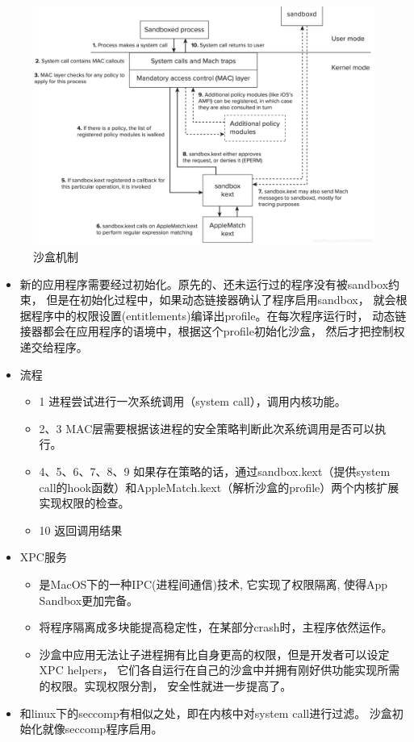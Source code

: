\documentclass[AutoFakeBold,a4paper]{ctexart}
\begin{document}
\begin{figure}[H]
    \centering
    \includegraphics[width=0.92\columnwidth]{Sandbox_Process.png}
    \caption{沙盒机制\cite{blazakis2011apple}}
\end{figure}

\begin{itemize}
    \item 新的应用程序需要经过初始化。原先的、还未运行过的程序没有被sandbox约束，
    但是在初始化过程中，如果动态链接器确认了程序启用sandbox，
    就会根据程序中的权限设置(entitlements)编译出profile。在每次程序运行时，
    动态链接器都会在应用程序的语境中，根据这个profile初始化沙盒，
    然后才把控制权递交给程序。
    \item 流程
    \begin{itemize}
        \item 1 进程尝试进行一次系统调用（system call），调用内核功能。
        \item 2、3 MAC层需要根据该进程的安全策略判断此次系统调用是否可以执行。
        \item 4、5、6、7、8、9 如果存在策略的话，通过sandbox.kext（提供system call的hook函数）和AppleMatch.kext（解析沙盒的profile）两个内核扩展实现权限的检查。
        \item 10 返回调用结果
    \end{itemize}
    \item XPC服务
    \begin{itemize}
        \item 是MacOS下的一种IPC(进程间通信)技术, 它实现了权限隔离, 
        使得App Sandbox更加完备。
        \item 将程序隔离成多块能提高稳定性，在某部分crash时，主程序依然运作。
        \item 沙盒中应用无法让子进程拥有比自身更高的权限，但是开发者可以设定XPC helpers，
        它们各自运行在自己的沙盒中并拥有刚好供功能实现所需的权限。实现权限分割，
        安全性就进一步提高了。
    \end{itemize}
    \item 和linux下的seccomp有相似之处，即在内核中对system call进行过滤。
    沙盒初始化就像seccomp程序启用。
\end{itemize}
\end{document}

